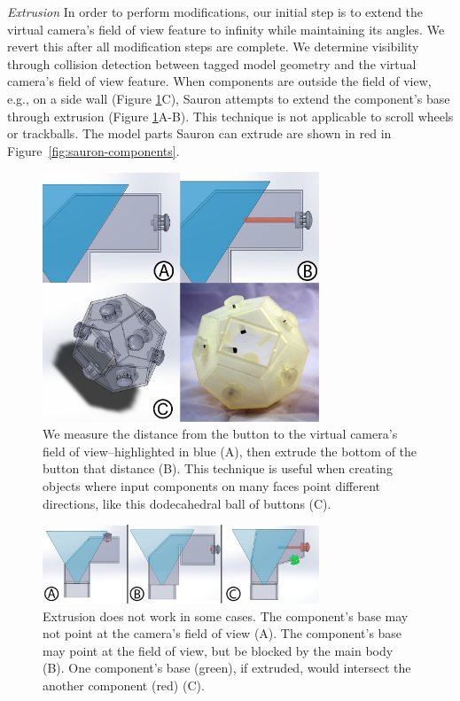 \emph{Extrusion}
In order to perform modifications, our initial step is to extend the virtual camera's field of view feature to infinity while maintaining its angles. We revert this after all modification steps are complete. We determine visibility through collision detection between tagged model geometry and the virtual camera's field of view feature.
When components are outside the field of view, e.g., on a side wall (Figure \ref{fig:sauron-extrusion}C), Sauron attempts to extend the component's base through extrusion (Figure \ref{fig:sauron-extrusion}A-B). This technique is not applicable to scroll wheels or trackballs. The model parts Sauron can extrude are shown in red in Figure~\ref{fig:sauron-components}.

\begin{figure}
\centering
\includegraphics[width=3.25in]{figures/sauron/fig6-extrude-and-dodecahedron.png}
\caption{We measure the distance from the button to the virtual camera's field of view--highlighted in blue (A), then extrude the bottom of the button that distance (B). This technique is useful when creating objects where input components on many faces point different directions, like this dodecahedral ball of buttons (C).}
\label{fig:sauron-extrusion}
\end{figure}

\begin{figure}
\centering
\includegraphics[width=3.25in]{figures/sauron/extrusion-fails.png}
\caption{Extrusion does not work in some cases. The component's base may not point at the camera's field of view (A). The component's base may point at the field of view, but be blocked by the main body (B). One component's base (green), if extruded, would intersect the another component (red) (C).}
\label{fig:sauron-extrusion-fails}
\end{figure}


